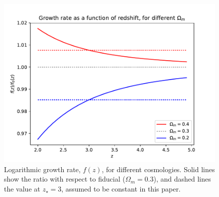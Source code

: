 \begin{figure}[ht]
 \begin{center}
  \includegraphics[scale=0.7]{Figures/fz_omega_m}
 \end{center}
 \caption{Logarithmic growth rate, $f(z)$, for different cosmologies.
  Solid lines show the ratio with respect to fiducial ($\Omega_m=0.3$), 
  and dashed lines the value at $z_\star=3$, assumed to be constant in this 
  paper.}
 \label{fig:fz_Om}
\end{figure}

